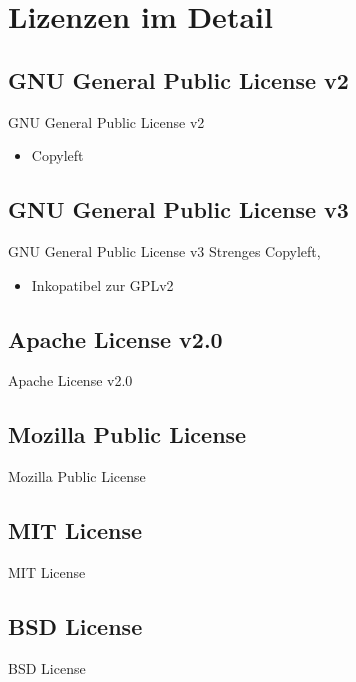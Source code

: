 \documentclass{beamer}
\begin{document}
\section{Lizenzen im Detail}
\subsection{GNU General Public License v2}
\begin{frame}{GNU General Public License v2}
	\begin{itemize}
		\item Copyleft
	\end{itemize}
\end{frame}

\subsection{GNU General Public License v3}
\begin{frame}{GNU General Public License v3}
	Strenges Copyleft,
	\begin{itemize}
		\item Inkopatibel zur GPLv2
	\end{itemize}
\end{frame}

\subsection{Apache License v2.0}
\begin{frame}{Apache License v2.0}
\end{frame}

\subsection{Mozilla Public License}
\begin{frame}{Mozilla Public License}
\end{frame}

\subsection{MIT License}
\begin{frame}{MIT License}
\end{frame}

\subsection{BSD License}
\begin{frame}{BSD License}
\end{frame}
\end{document}
